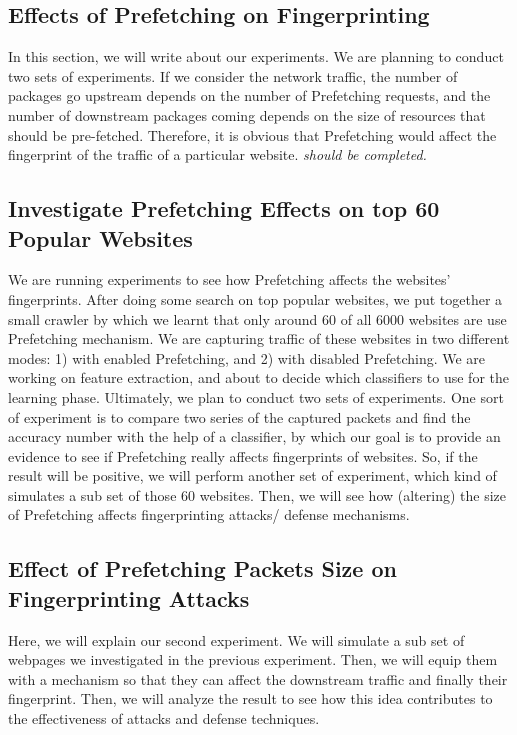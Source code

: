 \subsection{Effects of Prefetching on Fingerprinting}
In this section, we will write  about our experiments. We are planning to conduct two sets of experiments. If we consider the network traffic, the number of packages go upstream depends on the number of Prefetching requests, and the number of downstream packages coming depends on the size of resources that should be pre-fetched. Therefore, it is obvious that Prefetching would affect the fingerprint of the traffic of a particular website.  \emph{should be completed.}

\subsection{Investigate Prefetching Effects on top 60 Popular Websites}
We are running experiments to see how Prefetching affects the websites' fingerprints.
After doing some search on top popular websites, we put together a small crawler by which we learnt that only around 60 of all 6000 websites are use Prefetching mechanism. We are capturing traffic of these websites in two different modes: 1) with enabled Prefetching, and 2) with disabled Prefetching. We are working on feature extraction, and about to decide which classifiers to use for the learning phase.
Ultimately, we plan to conduct two sets of experiments. One sort of experiment is to compare two series of the captured packets and find the accuracy number with the help of a classifier, by which our goal is to provide an evidence to see if Prefetching really affects fingerprints of websites. So, if the result will be positive, we will perform another set of experiment, which kind of simulates a sub set of those 60 websites. Then, we will see how (altering) the size of Prefetching affects fingerprinting attacks/ defense mechanisms.


\subsection{Effect of Prefetching Packets Size on Fingerprinting Attacks}
Here, we will explain our second experiment. We will simulate a sub set of webpages we investigated in the previous experiment. Then, we will equip them with a mechanism so that they can affect the downstream traffic and finally their fingerprint. Then, we will analyze the result to see how this idea contributes to the effectiveness of attacks and defense techniques.

